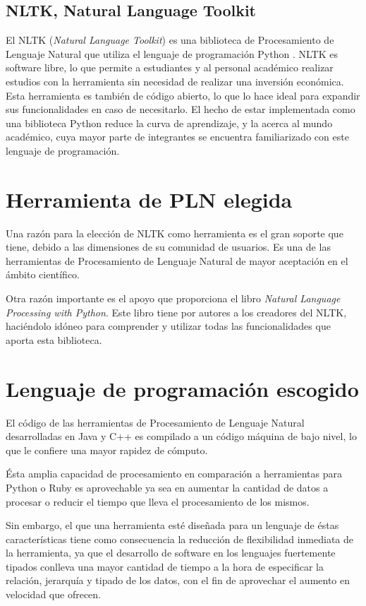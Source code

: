 \subsection{NLTK, Natural Language Toolkit}

El NLTK (\textit{Natural Language Toolkit}) es una biblioteca de Procesamiento de Lenguaje Natural que utiliza el lenguaje de programación Python \cite{nltk-book}.
%
NLTK es software libre, lo que permite a estudiantes y al personal académico realizar estudios con la herramienta sin necesidad de realizar una inversión económica.
%
Esta herramienta es también de código abierto, lo que lo hace ideal para expandir sus funcionalidades en caso de necesitarlo.
%
El hecho de estar implementada como una biblioteca Python reduce la curva de aprendizaje, y la acerca al mundo académico, cuya mayor parte de integrantes se encuentra familiarizado con este lenguaje de programación.

\label{chosen-nlp-tool}
\section{Herramienta de PLN elegida}

Una razón para la elección de NLTK como herramienta es el gran soporte que tiene, debido a las dimensiones de su comunidad de usuarios. Es una de las herramientas de Procesamiento de Lenguaje Natural de mayor aceptación en el ámbito científico.

Otra razón importante es el apoyo que proporciona el libro \textit{Natural Language Processing with Python}\cite{nltk-book}. Este libro tiene por autores a los creadores del NLTK, haciéndolo idóneo para comprender y utilizar todas las funcionalidades que aporta esta biblioteca.

\section{Lenguaje de programación escogido}

El código de las herramientas de Procesamiento de Lenguaje Natural desarrolladas en Java y C++ es compilado a un código máquina de bajo nivel, lo que le confiere una mayor rapidez de cómputo.

Ésta amplia capacidad de procesamiento en comparación a herramientas para Python o Ruby es aprovechable ya sea en aumentar la cantidad de datos a procesar o reducir el tiempo que lleva el procesamiento de los mismos.

Sin embargo, el que una herramienta esté diseñada para un lenguaje de éstas características tiene como consecuencia la reducción de flexibilidad inmediata de la herramienta, ya que el desarrollo de software en los lenguajes fuertemente tipados conlleva una mayor cantidad de tiempo a la hora de especificar la relación, jerarquía y tipado de los datos, con el fin de aprovechar el aumento en velocidad que ofrecen.

